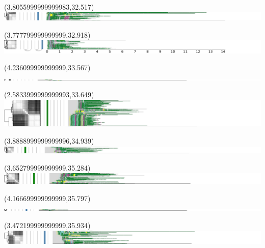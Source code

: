 \documentclass{article}
\begin{document}
\begin{textblock}{13}(3.8055999999999983,32.517)\includegraphics{latex/figures/haplotypes-constrained/chr21-HG006.pdf}\end{textblock}
\begin{textblock}{13}(3.777799999999999,32.918)\includegraphics{latex/figures/haplotypes-constrained/chr21-HG007.pdf}\end{textblock}
\begin{textblock}{13}(4.236099999999999,33.567)\includegraphics{latex/figures/haplotypes-constrained/chr22-HG001.pdf}\end{textblock}
\begin{textblock}{13}(2.5833999999999993,33.649)\includegraphics{latex/figures/haplotypes-constrained/chr22-HG002.pdf}\end{textblock}
\begin{textblock}{13}(3.8888999999999996,34.939)\includegraphics{latex/figures/haplotypes-constrained/chr22-HG003.pdf}\end{textblock}
\begin{textblock}{13}(3.652799999999999,35.284)\includegraphics{latex/figures/haplotypes-constrained/chr22-HG004.pdf}\end{textblock}
\begin{textblock}{13}(4.166699999999999,35.797)\includegraphics{latex/figures/haplotypes-constrained/chr22-HG005.pdf}\end{textblock}
\begin{textblock}{13}(3.472199999999999,35.934)\includegraphics{latex/figures/haplotypes-constrained/chr22-HG006.pdf}\end{textblock}
\end{document}
